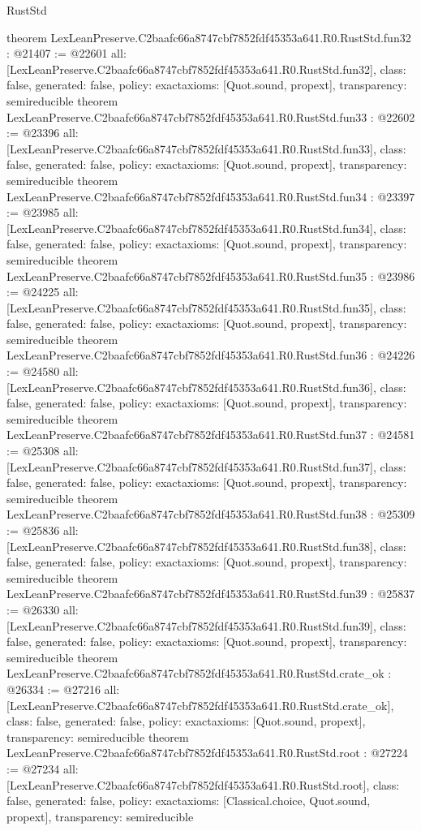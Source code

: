 \begin{lexlean}{RustStd}
\begin{coremodule}
{}
theorem LexLeanPreserve.C2baafc66a8747cbf7852fdf45353a641.R0.RustStd.fun32 : @21407 := @22601 {
  all: [LexLeanPreserve.C2baafc66a8747cbf7852fdf45353a641.R0.RustStd.fun32],
  class: false,
  generated: false,
  policy: exact{axioms: [Quot.sound, propext]},
  transparency: semireducible
}
theorem LexLeanPreserve.C2baafc66a8747cbf7852fdf45353a641.R0.RustStd.fun33 : @22602 := @23396 {
  all: [LexLeanPreserve.C2baafc66a8747cbf7852fdf45353a641.R0.RustStd.fun33],
  class: false,
  generated: false,
  policy: exact{axioms: [Quot.sound, propext]},
  transparency: semireducible
}
theorem LexLeanPreserve.C2baafc66a8747cbf7852fdf45353a641.R0.RustStd.fun34 : @23397 := @23985 {
  all: [LexLeanPreserve.C2baafc66a8747cbf7852fdf45353a641.R0.RustStd.fun34],
  class: false,
  generated: false,
  policy: exact{axioms: [Quot.sound, propext]},
  transparency: semireducible
}
theorem LexLeanPreserve.C2baafc66a8747cbf7852fdf45353a641.R0.RustStd.fun35 : @23986 := @24225 {
  all: [LexLeanPreserve.C2baafc66a8747cbf7852fdf45353a641.R0.RustStd.fun35],
  class: false,
  generated: false,
  policy: exact{axioms: [Quot.sound, propext]},
  transparency: semireducible
}
theorem LexLeanPreserve.C2baafc66a8747cbf7852fdf45353a641.R0.RustStd.fun36 : @24226 := @24580 {
  all: [LexLeanPreserve.C2baafc66a8747cbf7852fdf45353a641.R0.RustStd.fun36],
  class: false,
  generated: false,
  policy: exact{axioms: [Quot.sound, propext]},
  transparency: semireducible
}
theorem LexLeanPreserve.C2baafc66a8747cbf7852fdf45353a641.R0.RustStd.fun37 : @24581 := @25308 {
  all: [LexLeanPreserve.C2baafc66a8747cbf7852fdf45353a641.R0.RustStd.fun37],
  class: false,
  generated: false,
  policy: exact{axioms: [Quot.sound, propext]},
  transparency: semireducible
}
theorem LexLeanPreserve.C2baafc66a8747cbf7852fdf45353a641.R0.RustStd.fun38 : @25309 := @25836 {
  all: [LexLeanPreserve.C2baafc66a8747cbf7852fdf45353a641.R0.RustStd.fun38],
  class: false,
  generated: false,
  policy: exact{axioms: [Quot.sound, propext]},
  transparency: semireducible
}
theorem LexLeanPreserve.C2baafc66a8747cbf7852fdf45353a641.R0.RustStd.fun39 : @25837 := @26330 {
  all: [LexLeanPreserve.C2baafc66a8747cbf7852fdf45353a641.R0.RustStd.fun39],
  class: false,
  generated: false,
  policy: exact{axioms: [Quot.sound, propext]},
  transparency: semireducible
}
theorem LexLeanPreserve.C2baafc66a8747cbf7852fdf45353a641.R0.RustStd.crate_ok : @26334 := @27216 {
  all: [LexLeanPreserve.C2baafc66a8747cbf7852fdf45353a641.R0.RustStd.crate_ok],
  class: false,
  generated: false,
  policy: exact{axioms: [Quot.sound, propext]},
  transparency: semireducible
}
theorem LexLeanPreserve.C2baafc66a8747cbf7852fdf45353a641.R0.RustStd.root : @27224 := @27234 {
  all: [LexLeanPreserve.C2baafc66a8747cbf7852fdf45353a641.R0.RustStd.root],
  class: false,
  generated: false,
  policy: exact{axioms: [Classical.choice, Quot.sound, propext]},
  transparency: semireducible
}


\end{coremodule}
\end{lexlean}
